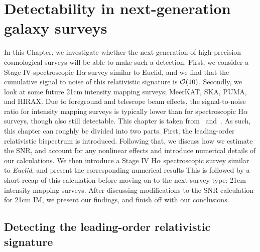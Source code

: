 
\chapter{Detectability in next-generation galaxy surveys}
\label{chapter:detect}


In this Chapter, we investigate whether the next generation of high-precision cosmological surveys will be able to make such a detection. First, we consider a Stage IV spectroscopic H$\alpha$ survey similar to Euclid, and we find that the cumulative signal to noise of this relativistic signature  is $\mathcal{O}(10)$. Secondly, we look at some future 21cm intensity mapping surveys; MeerKAT, SKA, PUMA, and HIRAX. Due to foreground and telescope beam effects, the signal-to-noise ratio for intensity mapping surveys is typically lower than for spectroscopic H$\alpha$ surveys, though also still detectable. This chapter is taken from~\cite{Jolicoeur:2020eup} and~\cite{Maartens:2019yhx}. As such, this chapter can roughly be divided into two parts. First, the leading-order relativistic bispectrum is introduced. Following that, we discuss how we estimate the SNR, and account for any nonlinear effects and introduce numerical details of our calculations. We then introduce a Stage IV H$\alpha$ spectroscopic survey similar to \emph{Euclid}, and present the corresponding numerical results This is followed by a short recap of this calculation before moving on to the next survey type: 21cm intensity mapping surveys. After discussing modifications to the SNR calculation for 21cm IM, we present our findings, and finish off with our conclusions.

\section{Detecting the leading-order relativistic signature}

